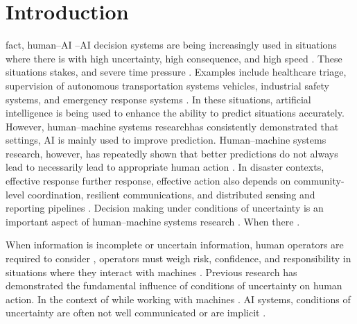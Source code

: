 \documentclass[journal]{IEEEtran}
\theoremstyle{plain}
\theoremstyle{definition}
\providecommand{\DIFaddtex}[1]{{\protect\color{blue} \sf #1}} %
\providecommand{\DIFdeltex}[1]{{\protect\color{red} \scriptsize #1}} %
\providecommand{\DIFaddbegin}{} %
\providecommand{\DIFaddend}{} %
\providecommand{\DIFdelbegin}{} %
\providecommand{\DIFdelend}{} %
\providecommand{\DIFadd}[1]{\texorpdfstring{\DIFaddtex{#1}}{#1}} %
\providecommand{\DIFdel}[1]{\texorpdfstring{\DIFdeltex{#1}}{}} %
\newcommand{\DIFscaledelfig}{0.5}
\newlength{\DIFdelgraphicswidth} %
\newlength{\DIFdelgraphicsheight} %
\newcommand{\DIFaddincludegraphics}[2][]{{\color{blue}\fbox{\DIFOincludegraphics[#1]{#2}}}} %
\newcommand{\DIFdelincludegraphics}[2][]{%
\sbox{\DIFdelgraphicsbox}{\DIFOincludegraphics[#1]{#2}}%
\settoboxwidth{\DIFdelgraphicswidth}{\DIFdelgraphicsbox} %
\settoboxtotalheight{\DIFdelgraphicsheight}{\DIFdelgraphicsbox} %
\scalebox{\DIFscaledelfig}{%
\parbox[b]{\DIFdelgraphicswidth}{\usebox{\DIFdelgraphicsbox}\\[-\baselineskip] \rule{\DIFdelgraphicswidth}{0em}}\llap{\resizebox{\DIFdelgraphicswidth}{\DIFdelgraphicsheight}{%
\setlength{\unitlength}{\DIFdelgraphicswidth}%
\begin{picture}(1,1)%
\thicklines\linethickness{2pt} %
{\color[rgb]{1,0,0}\put(0,0){\framebox(1,1){}}}%
{\color[rgb]{1,0,0}\put(0,0){\line( 1,1){1}}}%
{\color[rgb]{1,0,0}\put(0,1){\line(1,-1){1}}}%
\end{picture}%
}\hspace*{3pt}}} %
} %
\DeclareRobustCommand{\DIFaddbegin}{\DIFOaddbegin \let\includegraphics\DIFaddincludegraphics} %
\DeclareRobustCommand{\DIFaddend}{\DIFOaddend \let\includegraphics\DIFOincludegraphics} %
\DeclareRobustCommand{\DIFdelbegin}{\DIFOdelbegin \let\includegraphics\DIFdelincludegraphics} %
\DeclareRobustCommand{\DIFdelend}{\DIFOaddend \let\includegraphics\DIFOincludegraphics} %
\begin{document}
\section{Introduction}
\DIFdelbegin %
\DIFdel{fact, human--AI }\DIFdelend \DIFaddbegin {}\DIFadd{--AI }\DIFaddend decision systems are \DIFdelbegin \DIFdel{being }\DIFdelend \DIFaddbegin \DIFadd{increasingly }\DIFaddend used in situations \DIFdelbegin \DIFdel{where there is }\DIFdelend \DIFaddbegin \DIFadd{with }\DIFaddend high uncertainty, high \DIFdelbegin \DIFdel{consequence, and high speed \cite{Bach2024Access,PerezCerrolaza2024CSUR,Yang2022THMSReview}. These situations }\DIFdelend \DIFaddbegin \DIFadd{stakes, and severe time pressure \cite{Bach2024Access,PerezCerrolaza2024CSUR,Yang2022THMSReview}. Examples }\DIFaddend include healthcare triage, supervision of autonomous \DIFdelbegin \DIFdel{transportation systems}\DIFdelend \DIFaddbegin \DIFadd{vehicles}\DIFaddend , industrial safety\DIFdelbegin \DIFdel{systems}\DIFdelend , and emergency response \DIFdelbegin \DIFdel{systems }\DIFdelend \cite{Birkmann2013NatHazards,Sandoval2023IJDRS,Rokhideh2025IJDRS,Rao2024IJDRS,Charan2024,lim2026generativeaidrivenreliabilitylayer}. In these \DIFdelbegin \DIFdel{situations, artificial intelligence is being used to enhance the ability to predict situations accurately. However, human--machine systems researchhas consistently demonstrated that }\DIFdelend \DIFaddbegin \DIFadd{settings, AI is mainly used to improve prediction. Human--machine systems research, however, has repeatedly shown that better }\DIFaddend predictions do not \DIFdelbegin \DIFdel{always lead to }\DIFdelend \DIFaddbegin \DIFadd{necessarily lead to appropriate }\DIFaddend human action \cite{Lai2023FAccT,Muller2022CHIWORK,Hodgson2013THMS}. In disaster \DIFdelbegin \DIFdel{contexts, effective response further }\DIFdelend \DIFaddbegin \DIFadd{response, effective action also }\DIFaddend depends on community-level coordination, resilient communications, and distributed sensing and reporting \DIFdelbegin \DIFdel{pipelines \cite{Stephens2022SIGDOC,Longo2025PMC,Yang2005MobiHoc}.
Decision making under conditions of uncertainty is an important aspect of human--machine systems research \cite{Yang2022THMSReview,Bach2024Access,lim2026generativeaidrivenreliabilitylayer}. When there }\DIFdelend \DIFaddbegin \DIFadd{\cite{Stephens2022SIGDOC,Longo2025PMC,Yang2005MobiHoc}.
}

\DIFadd{When information }\DIFaddend is incomplete or uncertain\DIFdelbegin \DIFdel{information, human operators are required to consider }\DIFdelend \DIFaddbegin \DIFadd{, operators must weigh }\DIFaddend risk, confidence, and responsibility \DIFdelbegin \DIFdel{in situations where they interact with machines . Previous research has demonstrated the fundamental influence of conditions of uncertainty on human action. In the context of }\DIFdelend \DIFaddbegin \DIFadd{while working with machines \cite{Yang2022THMSReview,Bach2024Access}. }\DIFaddend AI systems, \DIFdelbegin \DIFdel{conditions of uncertainty are often not well communicated or are implicit \cite{McAllister2017IJCAI,Weidinger2022FAccT,Miller2019XRDS}. }%
\end{document}
